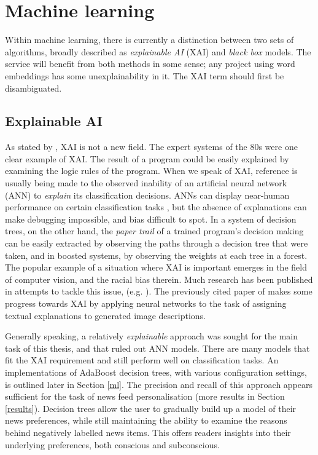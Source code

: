 \section{Machine learning\label{ml-bg}}

Within machine learning, there is currently a distinction between two sets of
algorithms, broadly described as {\it explainable AI} (XAI) and {\it black
box} models. The \nr{} service will benefit from both methods in
some sense; any project using word embeddings has some
unexplainability in it.  The XAI term should first be
disambiguated.

\subsection{Explainable AI} As stated by , XAI
is not a new field. The expert systems of the 80s were one
clear example of XAI. The result of a program could be easily
explained by examining the logic rules of the program.
When we speak of XAI, reference is usually being made to the observed
inability of an artificial neural network (ANN)
to {\it explain} its classification decisions. ANNs can display near-human
performance on certain classification tasks \cite{krizhevsky2012}, but the
absence of explanations can make debugging impossible, and bias difficult to
spot. In a system of decision trees, on the other hand, the {\it paper trail}
of a trained program's decision making can be easily extracted by observing
the paths through a decision tree that were taken, and in boosted systems, by
observing the weights at each tree in a forest. The popular example of a situation
where XAI is important emerges in the field of computer vision, and the
racial bias therein. Much research has been published in attempts
to tackle this issue, (e.g. ). The previously cited paper
of \cite{goebel2018} makes some progress towards XAI by applying
neural networks to the task of assigning textual explanations
to generated image descriptions.

Generally speaking, a relatively {\it explainable} approach
was sought for the main task of this thesis, and that ruled
out ANN models. There are many models that fit the XAI
requirement and still perform well on classification tasks.
An implementations of AdaBoost decision trees, with various
configuration settings, is outlined later in Section \ref{ml}.
The precision and recall of this approach appears sufficient
for the task of news feed personalisation (more results in
Section \ref{results}).  Decision trees allow the user to
gradually build up a model of their news preferences, while
still maintaining the ability to examine the reasons behind
negatively labelled news items.  This offers readers insights
into their underlying preferences, both conscious and
subconscious.

